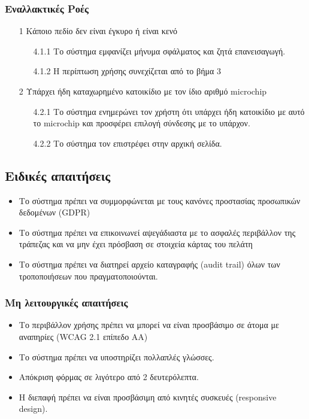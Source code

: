 \documentclass[12pt,a4paper,twoside]{book}
\begin{document}
\subsubsection{Εναλλακτικές Ροές}
\begin{enumerate}
  \item[1 ] Κάποιο πεδίο δεν είναι έγκυρο ή είναι κενό   %
        \begin{enumerate}
          \item[4.1.1 ] Το σύστημα εμφανίζει μήνυμα σφάλματος και ζητά επανεισαγωγή. %
          \item[4.1.2 ] Η περίπτωση χρήσης συνεχίζεται από το βήμα 3 %
        \end{enumerate}
  \item[2 ] Υπάρχει ήδη καταχωρημένο κατοικίδιο με τον ίδιο αριθμό microchip  %
        \begin{enumerate}
          \item[4.2.1 ] Το σύστημα ενημερώνει τον χρήστη ότι υπάρχει ήδη κατοικίδιο με αυτό το microchip  και προσφέρει επιλογή σύνδεσης με το υπάρχον. %
          \item[4.2.2 ] Το σύστημα τον επιστρέφει στην αρχική σελίδα. %
        \end{enumerate}
\end{enumerate}

\subsection{Ειδικές απαιτήσεις} %
\begin{itemize}
  \item Το σύστημα πρέπει να συμμορφώνεται με τους κανόνες προστασίας προσωπικών δεδομένων (GDPR)  %
  \item Το σύστημα πρέπει να επικοινωνεί αψεγάδιαστα με το ασφαλές περιβάλλον της τράπεζας και να μην έχει πρόσβαση σε στοιχεία κάρτας του πελάτη   %
  \item Το σύστημα πρέπει να διατηρεί αρχείο καταγραφής (audit trail) όλων των τροποποιήσεων που πραγματοποιούνται. %
\end{itemize}

\subsubsection{Μη λειτουργικές απαιτήσεις}
\begin{itemize}
  \item Το περιβάλλον χρήσης πρέπει να μπορεί να  είναι προσβάσιμο σε  άτομα με αναπηρίες (WCAG 2.1 επίπεδο AA) %
  \item Το σύστημα πρέπει να υποστηρίζει πολλαπλές γλώσσες.
  \item Απόκριση φόρμας σε λιγότερο από 2 δευτερόλεπτα. %
  \item Η διεπαφή πρέπει να είναι προσβάσιμη από κινητές συσκευές (responsive design). %
\end{itemize}
\end{document}
